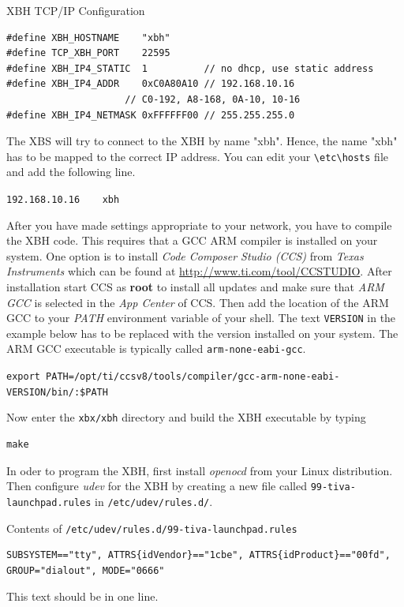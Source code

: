 \documentclass[twoside,11pt]{cergdoc}
\begin{document}
\begin{cergbox}{XBH TCP/IP Configuration}
\begin{lstlisting}
#define XBH_HOSTNAME    "xbh"
#define TCP_XBH_PORT    22595
#define XBH_IP4_STATIC  1          // no dhcp, use static address
#define XBH_IP4_ADDR    0xC0A80A10 // 192.168.10.16   
                     // C0-192, A8-168, 0A-10, 10-16
#define XBH_IP4_NETMASK 0xFFFFFF00 // 255.255.255.0
\end{lstlisting}
\end{cergbox}

The XBS will try to connect to the XBH by name "xbh". Hence, the name "xbh" has to 
be mapped to the correct IP address. You can edit your \verb|\etc\hosts| file
and add the following line.

\begin{center}
\verb|192.168.10.16    xbh|
\end{center}

After you have made settings appropriate to your network, you have to compile
the XBH code. This requires that a GCC ARM compiler is installed on your system.
One option is to install \emph{Code Composer Studio (CCS)} from \emph{Texas Instruments}
which can be found at \url{http://www.ti.com/tool/CCSTUDIO}. After installation
start CCS as \textbf{root} to install all updates and make sure that 
\emph{ARM GCC} is selected in the \emph{App Center} of CCS. Then add the location
of the ARM GCC to your \emph{PATH} environment variable of your shell. The text 
\texttt{VERSION} in the example below has to be replaced with the version installed
on your system. 
The ARM GCC executable is typically called \texttt{arm-none-eabi-gcc}.

\begin{center}
\lstinline|export PATH=/opt/ti/ccsv8/tools/compiler/gcc-arm-none-eabi-VERSION/bin/:$PATH| 
\end{center}

Now enter the \verb|xbx/xbh| directory and build the XBH executable by typing 

\begin{lstlisting}
make
\end{lstlisting}

In oder to program the XBH, first install \emph{openocd} from your Linux distribution.
Then configure \emph{udev} for the XBH by creating a new file called
\texttt{99-tiva-launchpad.rules} in \verb|/etc/udev/rules.d/|.

\begin{cergbox}{Contents of \texttt{/etc/udev/rules.d/99-tiva-launchpad.rules}}
\small\begin{lstlisting}
SUBSYSTEM=="tty", ATTRS{idVendor}=="1cbe", ATTRS{idProduct}=="00fd", 
GROUP="dialout", MODE="0666"
\end{lstlisting}
This text should be in one line.
\end{cergbox}
\end{document}
